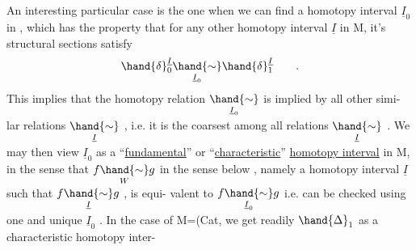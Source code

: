    An interesting particular case is the one when we can find a homotopy
interval  $\underline{I}_0$  in  ,  which has the property that for any other homotopy
interval $\underline{I}$ in M,  it's structural sections satisfy
\[ \hand{\delta}^{\underline{I}}_0 \underset{\underline{I}_0}{\hand{\sim}} \hand{\delta}^{\underline{I}}_1 \qquad . \]
This implies that the homotopy relation $\underset{\underline{I}_0}{\hand{\sim}}$ is implied by all other simi-%
lar relations $\underset{\underline{I}}{\hand{\sim}}$ ,  i.e. it is the coarsest among all relations $\underset{\underline{I}}{\hand{\sim}}$ .  We
may  then view $\underline{I}_0$ as a ``\uline{fundamental}'' or ``\uline{characteristic}'' \uline{homotopy
interval} in M,  in the sense that   $f\underset{W}{\hand{\sim}}g$  in the sense below ,
namely   a homotopy  interval $\underline{I}$ such that $f\underset{\underline{I}}{\hand{\sim}}g$ ,  is equi-%
valent to  $f\underset{\underline{I}_0}{\hand{\sim}}g$  i.e. can be checked using  one and unique  $\underline{I}_0$ .  In the
case of M=(Cat\hand{)},  we get readily $\hand{\Delta}_1$ as a characteristic homotopy inter-
